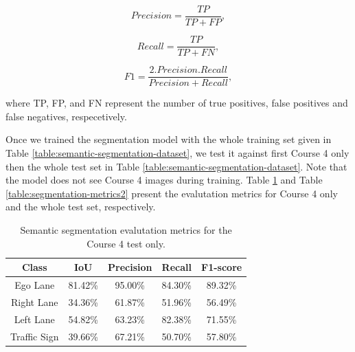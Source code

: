 \begin{equation}
  Precision = \frac{TP}{TP + FP},
  \label{eq:precision}
\end{equation}

\begin{equation}
  Recall = \frac{TP}{TP + FN},
  \label{eq:recall}
\end{equation}

\begin{equation}
  F1 = \frac{2.Precision.Recall}{Precision + Recall},
  \label{eq:F1}
\end{equation}

where TP, FP, and FN represent the number of true positives, false positives
and false negatives, respecetively.

Once we trained the segmentation model with the whole training set given in
Table \ref{table:semantic-segmentation-dataset}, we test it against first
Course 4 only then the whole test set in Table
\ref{table:semantic-segmentation-dataset}. Note that the model does not see
Course 4 images during training. Table \ref{table:segmentation-metrics1} and
Table \ref{table:segmentation-metrics2} present the evalutation metrics for
Course 4 only and the whole test set, respectively.

\begin{table}[h]
  \begin{center}
    \caption{Semantic segmentation evalutation metrics for the Course 4 test only.}
    \label{table:segmentation-metrics1}
    \begin{tabular}{|c|c|c|c|c|}
      \hline
      \textbf{Class} & \textbf{IoU} & \textbf{Precision} & \textbf{Recall} & \textbf{F1-score} \\
      \hline
      Ego Lane       & 81.42\%      & 95.00\%            & 84.30\%         & 89.32\% \\ 
      \hline
      Right Lane     & 34.36\%      & 61.87\%            & 51.96\%         & 56.49\% \\ 
      \hline
      Left Lane      & 54.82\%      & 63.23\%            & 82.38\%         & 71.55\% \\ 
      \hline
      Traffic Sign   & 39.66\%      & 67.21\%            & 50.70\%         & 57.80\% \\
      \hline
    \end{tabular}
  \end{center}
\end{table}

